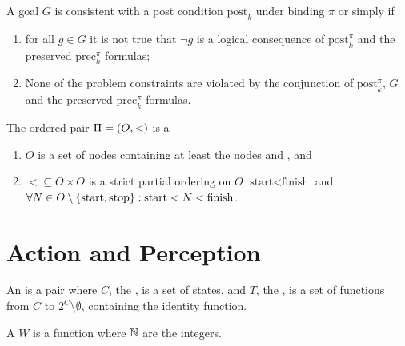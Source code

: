 \begin{defi}
A goal $G$ is consistent with a post condition $\mbox{post}_k$ under binding $\pi$ or simply  if
\begin{enumerate}
 \item for all $g\in G$ it is not true that $\neg g$ is a logical consequence of $\mbox{post}_k^{\pi}$ and the preserved $\mbox{prec}_k^{\pi}$ formulas;
 \item None of the problem constraints are violated by the conjunction of $\mbox{post}_k^{\pi}$, $G$ and the preserved $\mbox{prec}_k^{\pi}$ formulas.
\end{enumerate}
\cite{conf/ijcai/ChengI89}
\end{defi}

\begin{defi}
The ordered pair $\Pi=\left( O,<\right)$ is a  \iffTx{}
\begin{enumerate}
 \item $O$ is a set of nodes containing at least the nodes  and , and
 \item $<\subseteq O\times O$ is a strict partial ordering on $O$ \stTx{} $\mbox{start}<\mbox{finish}$ and $\forall N\in O\setminus\left\{ \mbox{start},\mbox{stop}\right\}:\mbox{start}<N<\mbox{finish}$.
\end{enumerate}
\cite{conf/ijcai/HertzbergH89}
\end{defi}


\section{Action and Perception}

\begin{defi}
An  is a pair  where $C$, the , is a set of states, and $T$, the , is a set of functions from $C$ to $2^C\setminus\emptyset$, containing the identity function.
\cite{conf/ijcai/BrafmanS95}
\end{defi}

\begin{defi}
A  $W$ is a function  where $\mathbb{N}$ are the integers.
\cite{conf/ijcai/BrafmanS95}
\end{defi}

